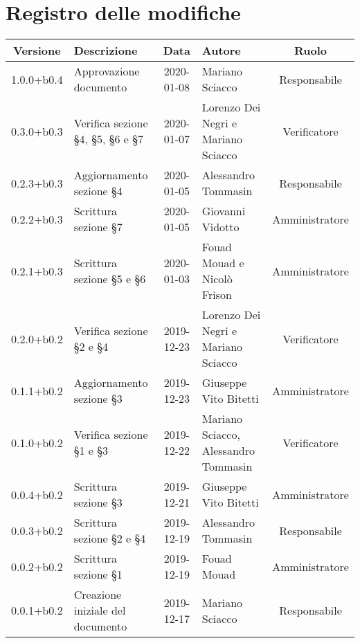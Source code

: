 \section*{Registro delle modifiche}

\begin{center}
	\begin{longtable}{|c|p{3cm}|c|p{4cm}|c|}
	\hline
	\rowcolor{lighter-grayer}
	\textbf{Versione} & \textbf{Descrizione} & \textbf{Data} & \textbf{Autore} & \textbf{Ruolo} \\
	\hline
	\endfirsthead

	1.0.0+b0.4 & Approvazione documento & 2020-01-08 & Mariano Sciacco & Responsabile \\
	\hline 
	0.3.0+b0.3 & Verifica sezione \S4, \S5, \S6 e \S7 & 2020-01-07 & Lorenzo Dei Negri e Mariano Sciacco & Verificatore \\
	\hline
	0.2.3+b0.3 & Aggiornamento sezione \S4  & 2020-01-05 & Alessandro Tommasin & Responsabile \\
	\hline  
	0.2.2+b0.3 & Scrittura sezione \S7  & 2020-01-05 & Giovanni Vidotto & Amministratore \\
	\hline 
	0.2.1+b0.3 & Scrittura sezione \S5 e \S6  & 2020-01-03 & Fouad Mouad e Nicolò Frison & Amministratore \\
	\hline 
	0.2.0+b0.2 & Verifica sezione \S2 e \S4  & 2019-12-23 & Lorenzo Dei Negri e Mariano Sciacco & Verificatore \\
	\hline 
	0.1.1+b0.2 & Aggiornamento sezione \S3 & 2019-12-23 & Giuseppe Vito Bitetti & Amministratore \\
	\hline
	0.1.0+b0.2 & Verifica sezione \S1 e \S3 & 2019-12-22 & Mariano Sciacco, Alessandro Tommasin & Verificatore \\
	\hline 
	0.0.4+b0.2 & Scrittura sezione \S3 & 2019-12-21 & Giuseppe Vito Bitetti & Amministratore \\
	\hline 
	0.0.3+b0.2 & Scrittura sezione \S2 e \S4 & 2019-12-19 & Alessandro Tommasin & Responsabile \\
	\hline 
	0.0.2+b0.2 & Scrittura sezione \S1 & 2019-12-19 & Fouad Mouad & Amministratore \\
	\hline 
	0.0.1+b0.2 & Creazione iniziale del documento & 2019-12-17 & Mariano Sciacco & Responsabile \\
	\hline
	

	\end{longtable}
\end{center}